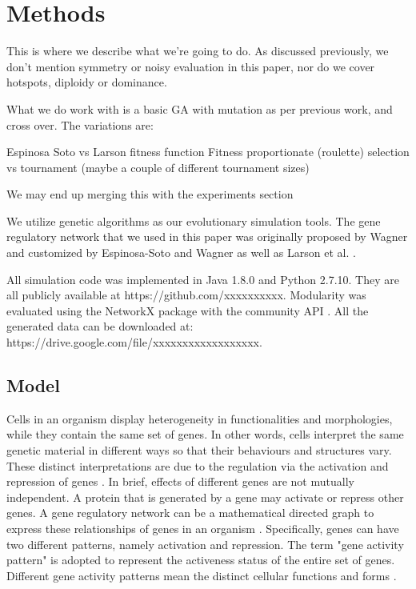 \section{Methods}
This is where we describe what we're going to do. As discussed previously, 
we don't mention symmetry or noisy evaluation in this paper, nor do we cover 
hotspots, diploidy or dominance.

What we do work with is a basic GA with mutation as per previous work, and cross
over. The variations are:

Espinosa Soto vs Larson fitness function
Fitness proportionate (roulette) selection vs tournament (maybe a couple of different tournament sizes)

We may end up merging this with the experiments section

We utilize genetic algorithms as our evolutionary simulation tools. The gene regulatory network that we used in this paper was originally proposed by Wagner \cite{wagner1996model} and customized by Espinosa-Soto and Wagner \cite{espinosa2010specialization} as well as Larson et al. \cite{larson2016hotspot}. 

All simulation code was implemented in Java 1.8.0 and Python 2.7.10. They are all publicly available at https://github.com/xxxxxxxxxx. Modularity was evaluated using the NetworkX package with the community API \cite{communityAPI}. All the generated data can be downloaded at: https://drive.google.com/file/xxxxxxxxxxxxxxxxxx. 

\subsection{Model}
Cells in an organism display heterogeneity in functionalities and morphologies, while they contain the same set of genes. In other words, cells interpret the same genetic material in different ways so that their behaviours and structures vary. These distinct interpretations are due to the regulation via the activation and repression of genes \cite{wagner1996model}. In brief, effects of different genes are not mutually independent. A protein that is generated by a gene may activate or repress other genes. A gene regulatory network can be a mathematical directed graph to express these relationships of genes in an organism \cite{wagner1996model}. Specifically, genes can have two different patterns, namely activation and repression. The term "gene activity pattern" is adopted to represent the activeness status of the entire set of genes. Different gene activity patterns mean the distinct cellular functions and forms \cite{espinosa2010specialization}. 

